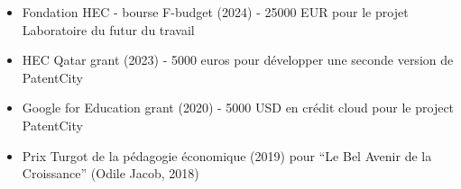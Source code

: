 \documentclass[12pt]{article}
\begin{document}
\begin{itemize}
    \item Fondation HEC - bourse F-budget (2024) - 25000 EUR pour le projet Laboratoire du futur du travail
    \item HEC Qatar grant (2023) - 5000 euros pour développer une seconde version de PatentCity
    \item Google for Education grant (2020) - 5000 USD en crédit cloud pour le project PatentCity
    \item Prix Turgot de la pédagogie économique (2019) pour ``Le Bel Avenir de la Croissance'' (Odile Jacob, 2018) 
    
\end{itemize}
\end{document}
